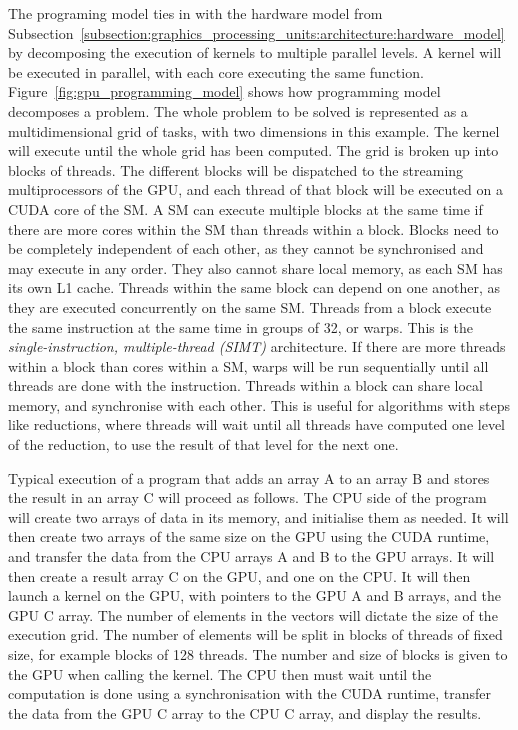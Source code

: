 The programing model ties in with the hardware model from
Subsection~\ref{subsection:graphics_processing_units:architecture:hardware_model} by decomposing the
execution of kernels to multiple parallel levels. A kernel will be executed in parallel, with each
core executing the same function. Figure~\ref{fig:gpu_programming_model} shows how programming model
decomposes a problem. The whole problem to be solved is represented as a multidimensional grid of
tasks, with two dimensions in this example. The kernel will execute until the whole grid has been
computed. The grid is broken up into blocks of threads. The different blocks will be dispatched to
the streaming multiprocessors of the GPU, and each thread of that block will be executed on a CUDA
core of the SM. A SM can execute multiple blocks at the same time if there are more cores within the
SM than threads within a block. Blocks need to be completely independent of each other, as they
cannot be synchronised and may execute in any order. They also cannot share local memory, as each SM
has its own L1 cache. Threads within the same block can depend on one another, as they are executed
concurrently on the same SM. Threads from a block execute the same instruction at the same time in
groups of 32, or warps. This is the \textit{single-instruction, multiple-thread (SIMT)}
architecture. If there are more threads within a block than cores within a SM, warps will be run
sequentially until all threads are done with the instruction. Threads within a block can share local
memory, and synchronise with each other. This is useful for algorithms with steps like reductions,
where threads will wait until all threads have computed one level of the reduction, to use the
result of that level for the next one.

Typical execution of a program that adds an array A to an array B and stores the result in an array
C will proceed as follows. The CPU side of the program will create two arrays of data in its memory,
and initialise them as needed. It will then create two arrays of the same size on the GPU using the
CUDA runtime, and transfer the data from the CPU arrays A and B to the GPU arrays. It will then
create a result array C on the GPU, and one on the CPU. It will then launch a kernel on the GPU, 
with pointers to the GPU A and B arrays, and the GPU C array. The number of elements in the vectors
will dictate the size of the execution grid. The number of elements will be split in blocks of
threads of fixed size, for example blocks of 128 threads. The number and size of blocks is given to
the GPU when calling the kernel. The CPU then must wait until the computation is done using a
synchronisation with the CUDA runtime, transfer the data from the GPU C array to the CPU C array,
and display the results. 

